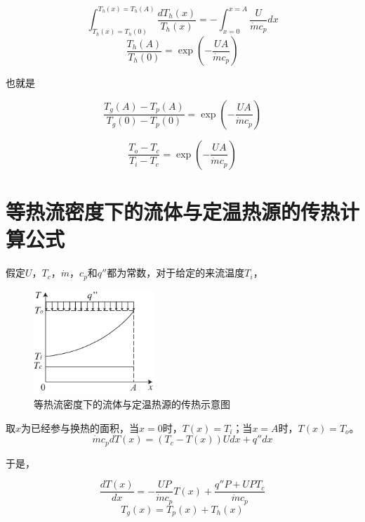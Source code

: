 \begin{equation}
\int_{T_{h}(x)=T_{h}(0)}^{T_{h}(x)=T_{h}(A)}\frac{dT_{h}(x)}{T_{h}(x)}=-\int_{x=0}^{x=A}\frac{U}{\dot{m}c_{p}}dx
\end{equation}
\begin{equation}
\frac{T_{h}(A)}{T_{h}(0)}=\exp(-\frac{UA}{\dot{m}c_{p}})
\end{equation}

也就是

\begin{equation}
\frac{T_{g}(A)-T_{p}(A)}{T_{g}(0)-T_{p}(0)}=\exp(-\frac{UA}{\dot{m}c_{p}})
\end{equation}

\begin{equation}
\frac{T_{o}-T_{c}}{T_{i}-T_{c}}=\exp(-\frac{UA}{\dot{m}c_{p}})
\label{eq:Eq}
\end{equation}

\chapter{等热流密度下的流体与定温热源的传热计算公式}
\label{cha:CTCHFHX}

假定$U$，$T_{c}$，$\dot{m}$，$c_p$和$q''$都为常数，对于给定的来流温度${T_i}$，

\begin{figure}[h]
\begin{centering}
\includegraphics[width=0.4\textwidth]{fig/CTCHFHX.pdf}\caption{等热流密度下的流体与定温热源的传热示意图}
\label{fig:CTCHFHX}
\end{centering}
\end{figure}

取$x$为已经参与换热的面积，当$x=0$时，$T(x)=T_i$；当$x=A$时，$T(x)=T_o$。
\begin{equation}
\dot{m}c_{p}dT(x)=(T_{c}-T(x))Udx+q''dx
\end{equation}

于是，

\begin{equation}
\frac{dT(x)}{dx}=-\frac{UP}{\dot{m}c_{p}}T(x)+\frac{q''P+UPT_{c}}{\dot{m}c_{p}}
\end{equation}
\begin{equation}
T_{g}(x)=T_{p}(x)+T_{h}(x)
\end{equation}

